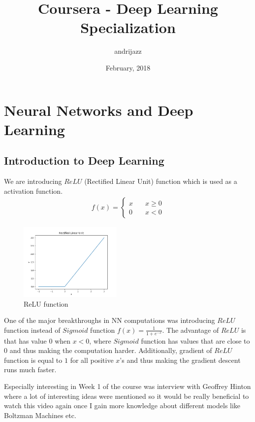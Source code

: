 \documentclass[a4paper]{report}
\title{Coursera - Deep Learning Specialization}
\date{February, 2018}
\author{andrijazz}
\newcommand{\insertcode}[2]{\begin{itemize}\item[]\end{itemize}} %
\begin{document}
\maketitle

\chapter{Neural Networks and Deep Learning}

\section{Introduction to Deep Learning}
We are introducing $ReLU$ (Rectified Linear Unit) function which is used as a activation function. 
\begin{align}
f(x) =
	\begin{cases}
		x   & \quad x \geq 0\\
		0	& \quad x < 0
	\end{cases}
\end{align}

\begin{figure}[!h]
	\centering
	\includegraphics[width=50mm]{../plots/relu.png}
	\caption{ReLU function}
	\label{fig:relu}
\end{figure}

One of the major breakthroughs in NN computations was introducing $ReLU$ function instead of $Sigmoid$ function $f(x) = \frac{1}{1 + e ^{-x}}$. The advantage of $ReLU$ is that has value $0$ when $x < 0$, where $Sigmoid$ function has values that are close to $0$ and thus making the computation harder.
Additionally, gradient of $ReLU$ function is equal to $1$ for all positive $x$'s and thus making the gradient descent runs much faster.

Especially interesting in Week 1 of the course was interview with Geoffrey Hinton where a lot of interesting ideas were mentioned so it would be really beneficial to watch this video again once I gain more knowledge about different models like Boltzman Machines etc.
\end{document}
